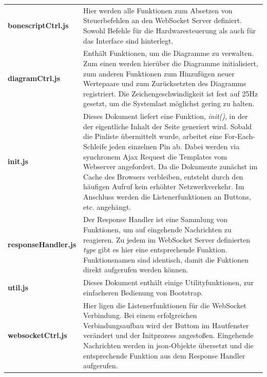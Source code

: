 \begin{longtabu} to \textwidth {
X[1]
X[3]}
\textbf{bonescriptCtrl.js} & Hier werden alle Funktionen zum Absetzen von Steuerbefehlen an den WebSocket Server definiert. Sowohl Befehle für die Hardwaresteuerung als auch für das Interface sind hinterlegt.\newline\\

\textbf{diagramCtrl.js} & Enthält Funktionen, um die Diagramme zu verwalten. Zum einen werden hierüber die Diagramme initialisiert, zum anderen Funktionen zum Hinzufügen neuer Wertepaare und zum Zurücksetzten des Diagramms registriert. Die Zeichengeschwindigkeit ist fest auf 25Hz gesetzt, um die Systemlast möglichst gering zu halten.\newline\\

\textbf{init.js} & Dieses Dokument liefert eine Funktion, \textit{init()}, in der der eigentliche Inhalt der Seite generiert wird. Sobald die Pinliste übermittelt wurde, arbeitet eine For-Each-Schleife jeden einzelnen Pin ab. Dabei werden via synchronem Ajax Request die Templates vom Webserver angefordert. Da die Dokumente zunächst im Cache des Browsers verbleiben, entsteht durch den häufigen Aufruf kein erhöhter Netzwerkverkehr. Im Anschluss werden die Listenerfunktionen an Buttons, etc. angehängt.\newline\\

\textbf{responseHandler.js} & Der Response Handler ist eine Sammlung von Funktionen, um auf eingehende Nachrichten zu reagieren. Zu jedem im WebSocket Server definierten \textit{type} gibt es hier eine entsprechende Funktion. Funktionsnamen sind identisch, damit die Fuktionen direkt aufgerufen werden können.\newline\\

\textbf{util.js} & Dieses Dokument enthält einige Utilityfunktionen, zur einfacheren Bedienung von Bootstrap.\newline\\

\textbf{websocketCtrl.js} & Hier ligen die Listenerfunktionen für die WebSocket Verbindung. Bei einem erfolgreichen Verbindungsaufbau wird der Buttom im Hautfenster verändert und der Initprozess angestoßen. Eingehende Nachrichten werden in \gls{json}-Objekte übersetzt und die entsprechende Funktion aus dem Response Handler aufgerufen.\newline\\
\end{longtabu}


